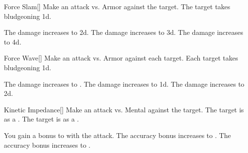\lowercase{\hypertarget{spell:Force Slam}{}}\label{spell:Force Slam}
\begin{freeability}[Rank 1]{\hypertarget{spell:Force Slam}{Force Slam}}[]
Make an attack vs. Armor against the target.
\hit The target takes bludgeoning  \plus1d.

\rankline
{} The damage increases to  \plus2d.
 The damage increases to  \plus3d.
 The damage increases to  \plus4d.
\end{freeability}
\vspace{0.25em}



\lowercase{\hypertarget{spell:Force Wave}{}}\label{spell:Force Wave}
\begin{freeability}[Rank 1]{\hypertarget{spell:Force Wave}{Force Wave}}[]
Make an attack vs. Armor against each target.
\hit Each target takes bludgeoning  \minus1d.

\rankline
{} The damage increases to .
 The damage increases to  \plus1d.
 The damage increases to  \plus2d.
\end{freeability}
\vspace{0.25em}



\lowercase{\hypertarget{spell:Kinetic Impedance}{}}\label{spell:Kinetic Impedance}
\begin{freeability}[Rank 1]{\hypertarget{spell:Kinetic Impedance}{Kinetic Impedance}}[]
Make an attack vs. Mental against the target.
\hit The target is  as a .
\crit The target is  as a .

\rankline
{} You gain a  bonus to  with the attack.
 The accuracy bonus increases to .
 The accuracy bonus increases to .
\end{freeability}
\vspace{0.25em}



